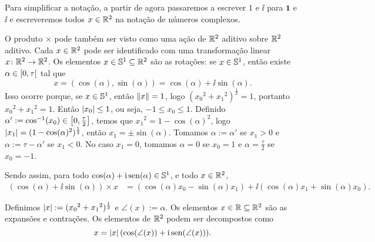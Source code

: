 Para simplificar a notação, a partir de agora passaremos a escrever $1$ e $\ii$ para $\bm 1$ e $\bm \ii$ e escreveremos todos $x \in \R^2$ na notação de números complexos.

O produto $\times$ pode também ser visto como uma ação de $\R^2$ aditivo sobre $\R^2$ aditivo. Cada $x \in \R^2$ pode ser identificado com uma transformação linear $x\colon \R^2 \to \R^2$. Os elementos $x \in \S^1 \subseteq \R^2$ são as rotações: se $x \in \S^1$, então existe $\alpha \in \intfa{0}{\tau}$ tal que
	\begin{equation*}
	x = (\cos(\alpha),\sin(\alpha)) = \cos(\alpha) + \ii \sin(\alpha).
	\end{equation*}
Isso ocorre porque, se $x \in \S^1$, então $\nor{x} = 1$, logo $({x_0}^2+{x_1}^2)^\frac{1}{2} = 1$, portanto ${x_0}^2+{x_1}^2 = 1$. Então $\abs{x_0} \leq 1$, ou seja, $-1 \leq x_0 \leq 1$. Definido $\alpha' := \cos\inv(x_0) \in \intff{0}{\frac{\tau}{2}}$, temos que ${x_1}^2 = 1-\cos(\alpha)^2$, logo $\abs{x_1} = (1-\cos(\alpha)^2)^\frac{1}{2}$, então $x_1 = \pm\sin(\alpha)$. Tomamos $\alpha := \alpha'$ se $x_1 > 0$ e $\alpha := \tau - \alpha'$ se $x_1 < 0$. No caso $x_1 = 0$, tomamos $\alpha = 0$ se $x_0=1$ e $\alpha = \frac{\tau}{2}$ se $x_0=-1$.

Sendo assim, para todo $\cos(\alpha) + \ii \sin(\alpha) \in \S^1$, e todo $x \in \R^2$,
	\begin{align*}
	(\cos(\alpha) + \ii \sin(\alpha)) \times x &= (\cos(\alpha)x_0-\sin(\alpha)x_1) + \ii(\cos(\alpha)x_1+\sin(\alpha)x_0).
	\end{align*}

Definimos $\abs{x} := ({x_0}^2+{x_1}^2)^\frac{1}{2}$ e $\angle(x) := \alpha$. Os elementos $x \in \R \subseteq \R^2$ são as expansões e contrações. Os elementos de $\R^2$ podem ser decompostos como
	\begin{equation*}
	x = \abs{x}(\cos(\angle(x))+\ii\sin(\angle(x))).
	\end{equation*}


